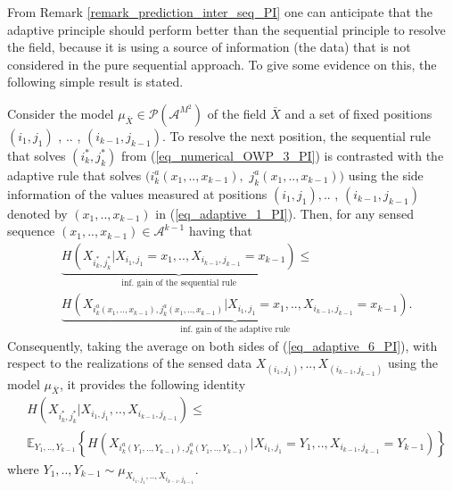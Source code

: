 From Remark \ref{remark_prediction_inter_seq_PI} one can anticipate that the adaptive principle should perform better than the sequential principle to resolve the field, because it is using a source of information (the data) that is not considered in the pure sequential approach. To give some evidence on this, the following simple result is stated.

\begin{proposition}
	\label{pro_gain_from_using_data_PI}
	Consider the model $\mu_{\bar{X}}\in \mathcal{P}(\mathcal{A}^{M^2})$ of the field $\bar{X}$ and a set of fixed positions $(i_1,j_1)$ , $..$ , $(i_{k-1},j_{k-1})$. To resolve the next position, the sequential rule that solves $(i^*_k,j^*_k)$ from (\ref{eq_numerical_OWP_3_PI}) is contrasted with the adaptive rule  that solves $(i^a_k(x_1,..,x_{k-1}),$ $j^a_k(x_1,..,x_{k-1}))$ using the side information of the values measured at positions $(i_1,j_1),..$ , $(i_{k-1},j_{k-1})$ denoted by $(x_1,..,x_{k-1})$ in (\ref{eq_adaptive_1_PI}). Then, for any sensed sequence $(x_1,..,x_{k-1})\in \mathcal{A}^{k-1}$ having that
\begin{align} \label{eq_adaptive_6_PI}
	&\underbrace{H(X_{i^*_k,j^*_k}|X_{i_1,j_1}=x_1,..,X_{i_{k-1},j_{k-1}}=x_{k-1})}_{\text{inf. gain of the sequential rule}} \leq \nonumber\\  
	&\underbrace{H(X_{i^a_k(x_1,..,x_{k-1}),j^a_k(x_1,..,x_{k-1})}|X_{i_1,j_1}=x_1,..,X_{i_{k-1},j_{k-1}}=x_{k-1})}_{\text{inf. gain of the adaptive rule}}.
\end{align}
Consequently, taking the average on both sides  of (\ref{eq_adaptive_6_PI}),  with respect to the realizations of the sensed data $X_{(i_1,j_1)},..,X_{(i_{k-1},j_{k-1})}$ using the model $\mu_{\bar{X}}$, it provides the following identity
\begin{align} \label{eq_adaptive_7_PI}
    	&H(X_{i^*_k,j^*_k}|X_{i_1,j_1},..,X_{i_{k-1},j_{k-1}}) \leq\\ %
	&\mathbb{E}_{Y_1,..,Y_{k-1}} \left\{ H(X_{i^a_k(Y_1,..,Y_{k-1}),j^a_k(Y_1,..,Y_{k-1})}|X_{i_1,j_1}=Y_1,..,X_{i_{k-1},j_{k-1}}=Y_{k-1}) \right\}\nonumber
\end{align}
where $Y_1,..,Y_{k-1}\sim \mu_{X_{i_1,j_1},..,X_{i_{k-1},j_{k-1}}}$. 
\end{proposition}


